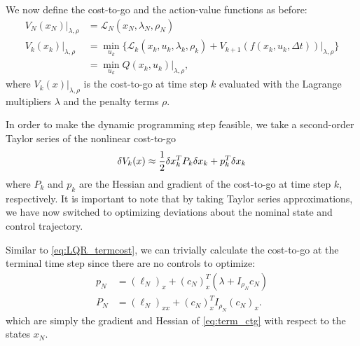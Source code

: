 \documentclass[../root.tex]{subfiles}
\begin{document}
    We now define the cost-to-go and the action-value functions as before:
    \begin{align}
        V_N(x_N)|_{\lambda,\rho} &= \mathcal{L}_N(x_N,\lambda_N,\rho_N) \label{eq:term_ctg} \\
        V_k(x_k)|_{\lambda,\rho} &= \min_{u_k}\{ \mathcal{L}_k(x_k,u_k,\lambda_k,\rho_k) 
        + V_{k+1}(f(x_k,u_k,\Delta t))|_{\lambda,\rho}\}  \\
        &= \min_{u_k} Q(x_k,u_k)|_{\lambda,\rho},
    \end{align}
    where $V_k(x)|_{\lambda, \rho}$ is the cost-to-go at time step $k$
    evaluated with the Lagrange multipliers $\lambda$ and the penalty terms
    $\rho$.

    In order to make the dynamic programming step feasible, we take a
    second-order Taylor series of the nonlinear cost-to-go
    \begin{equation}
        \delta V_k(x) \approx \frac{1}{2} \delta x_k^T P_k \delta x_k + p_k^T \delta x_k
    \end{equation}
    where $P_k$ and $p_k$ are the Hessian and gradient of the cost-to-go at
    time step $k$, respectively. It is important to note that by taking
    Taylor series approximations, we have now switched to optimizing
    deviations about the nominal state and control trajectory.

    Similar to \eqref{eq:LQR_termcost}, we can trivially calculate the
    cost-to-go at the terminal time step since there are no controls to
    optimize:
    \begin{align}
        p_{N} &= (\ell_N)_x + (c_N)_x^T(\lambda + I_{\rho_N}c_N) \label{eq:term_ctg_grad_exp}\\
        P_{N} &= (\ell_N)_{xx} + (c_N)^T_x I_{\rho_N} (c_N)_x \label{eq:term_ctg_hess_exp}.
    \end{align}
    which are simply the gradient and Hessian of \eqref{eq:term_ctg} with
    respect to the states $x_N$.
\end{document}
